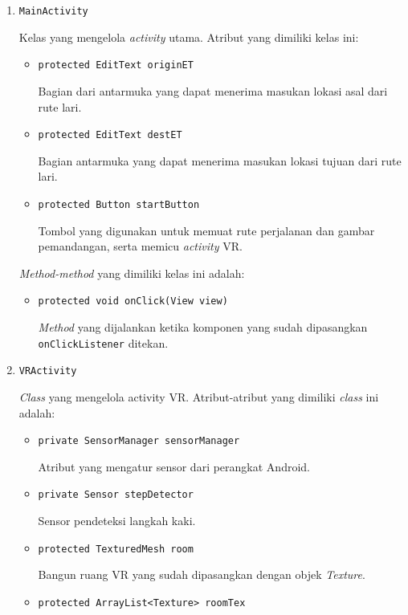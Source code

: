 \begin{enumerate}
	\item \texttt{MainActivity}
	
	Kelas yang mengelola \textit{activity} utama. Atribut yang dimiliki kelas ini:
	
	\begin{itemize}
		\item \texttt{protected EditText originET}
		
		Bagian dari antarmuka yang dapat menerima masukan lokasi asal dari rute lari.
		\item \texttt{protected EditText destET}
		
		Bagian antarmuka yang dapat menerima masukan lokasi tujuan dari rute lari.
		\item \texttt{protected Button startButton}
		
		Tombol yang digunakan untuk memuat rute perjalanan dan gambar pemandangan, serta memicu \textit{activity} VR.
	\end{itemize}
	
	\textit{Method-method} yang dimiliki kelas ini adalah:
	
	\begin{itemize}
		\item \texttt{protected void onClick(View view)}
		
		\textit{Method} yang dijalankan ketika komponen yang sudah dipasangkan \texttt{onClickListener} ditekan. 
		
	\end{itemize}
	\item \texttt{VRActivity}
	
	\textit{Class} yang mengelola activity VR. Atribut-atribut yang dimiliki \textit{class} ini adalah:
	
	\begin{itemize}
		\item \texttt{private SensorManager sensorManager}
		
		Atribut yang mengatur sensor dari perangkat Android.
		\item \texttt{private Sensor stepDetector}
		
		Sensor pendeteksi langkah kaki.
		\item \texttt{protected TexturedMesh room}
		
		Bangun ruang VR yang sudah dipasangkan dengan objek \textit{Texture}.
		\item \texttt{protected ArrayList<Texture> roomTex}
		

\end{itemize}
\end{enumerate}
